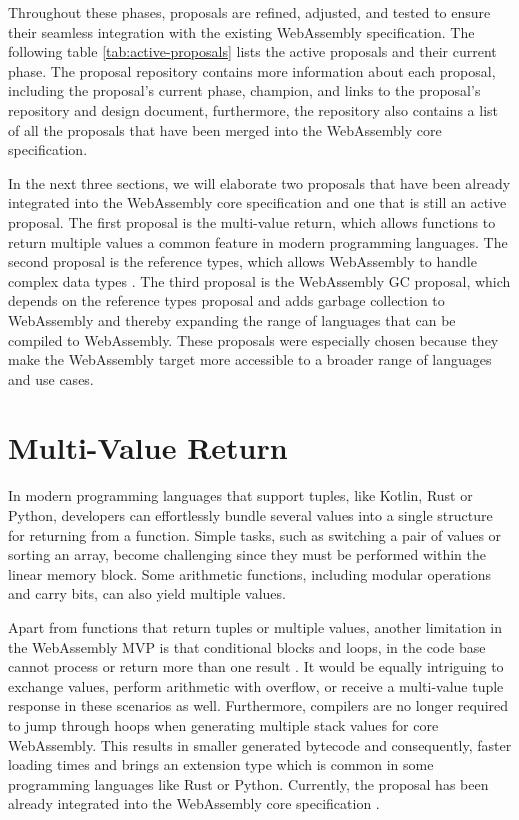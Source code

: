 Throughout these phases, proposals are refined, adjusted, and tested to ensure their seamless integration with the existing WebAssembly specification. The following table \ref{tab:active-proposals} lists the active proposals and their current phase. The proposal repository \cite{webassemblywg_2023_webassembly} contains more information about each proposal, including the proposal's current phase, champion, and links to the proposal's repository and design document, furthermore, the repository also contains a list of all the proposals that have been merged into the WebAssembly core specification.

In the next three sections, we will elaborate two proposals that have been already integrated into the WebAssembly core specification and one that is still an active proposal. The first proposal is the multi-value return, which allows functions to return multiple values a common feature in modern programming languages. The second proposal is the reference types, which allows WebAssembly to handle complex data types \cite{couriol_2020_webassembly}. The third proposal is the \gls{WebAssembly} GC proposal, which depends on the reference types proposal and adds garbage collection to WebAssembly and thereby expanding the range of languages that can be compiled to WebAssembly. These proposals were especially chosen because they make the WebAssembly target more accessible to a broader range of languages and use cases.



\section{Multi-Value Return}
\label{sec:multi-value-return}

In modern programming languages that support tuples, like Kotlin, Rust or Python, developers can effortlessly bundle several values into a single structure for returning from a function. 
Simple tasks, such as switching a pair of values or sorting an array, become challenging since they must be performed within the linear memory block. 
Some arithmetic functions, including modular operations and carry bits, can also yield multiple values.

Apart from functions that return tuples or multiple values, another limitation in the WebAssembly MVP is that conditional blocks and loops, in the code base cannot process or return more than one result \cite{sletten_2021_webassembly}. 
It would be equally intriguing to exchange values, perform arithmetic with overflow, or receive a multi-value tuple response in these scenarios as well. 
Furthermore, compilers are no longer required to jump through hoops when generating multiple stack values for core WebAssembly. This results in smaller generated bytecode and consequently, faster loading times and brings an extension type which is common in some programming languages like Rust or Python. Currently, the proposal has been already integrated into the WebAssembly core specification \cite{webassemblywg_2023_webassembly}. 

